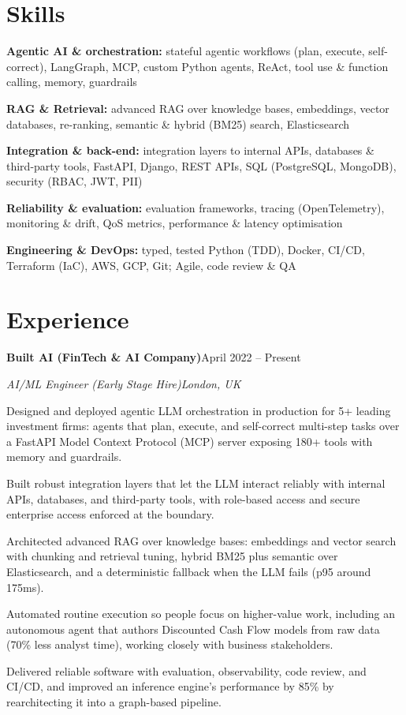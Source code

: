 \documentclass[10pt,a4paper]{article}
\newcommand{\entry}[4]{%
  {\color{company}\bfseries #1}\hfill {\color{muted}#2}\par
  \vspace{1pt}
  {\itshape #3}\hfill {\color{muted}\itshape #4}\par
  \vspace{3pt}%
}
\begin{document}
\section{Skills}
\begin{tight}
  \item[\textcolor{accent}{\small$\bullet$}] \textbf{Agentic AI \& orchestration:} stateful agentic workflows (plan, execute, self-correct), LangGraph, MCP, custom Python agents, ReAct, tool use \& function calling, memory, guardrails
  \item[\textcolor{accent}{\small$\bullet$}] \textbf{RAG \& Retrieval:} advanced RAG over knowledge bases, embeddings, vector databases, re-ranking, semantic \& hybrid (BM25) search, Elasticsearch
  \item[\textcolor{accent}{\small$\bullet$}] \textbf{Integration \& back-end:} integration layers to internal APIs, databases \& third-party tools, FastAPI, Django, REST APIs, SQL (PostgreSQL, MongoDB), security (RBAC, JWT, PII)
  \item[\textcolor{accent}{\small$\bullet$}] \textbf{Reliability \& evaluation:} evaluation frameworks, tracing (OpenTelemetry), monitoring \& drift, QoS metrics, performance \& latency optimisation
  \item[\textcolor{accent}{\small$\bullet$}] \textbf{Engineering \& DevOps:} typed, tested Python (TDD), Docker, CI/CD, Terraform (IaC), AWS, GCP, Git; Agile, code review \& QA
\end{tight}

\section{Experience}
\entry{Built AI (FinTech \& AI Company)}{April 2022 -- Present}{AI/ML Engineer (Early Stage Hire)}{London, UK}
\begin{tight}
  \item Designed and deployed agentic LLM orchestration in production for 5+ leading investment firms: agents that plan, execute, and self-correct multi-step tasks over a FastAPI Model Context Protocol (MCP) server exposing 180+ tools with memory and guardrails.
  \item Built robust integration layers that let the LLM interact reliably with internal APIs, databases, and third-party tools, with role-based access and secure enterprise access enforced at the boundary.
  \item Architected advanced RAG over knowledge bases: embeddings and vector search with chunking and retrieval tuning, hybrid BM25 plus semantic over Elasticsearch, and a deterministic fallback when the LLM fails (p95 around 175ms).
  \item Automated routine execution so people focus on higher-value work, including an autonomous agent that authors Discounted Cash Flow models from raw data (70\% less analyst time), working closely with business stakeholders.
  \item Delivered reliable software with evaluation, observability, code review, and CI/CD, and improved an inference engine's performance by 85\% by rearchitecting it into a graph-based pipeline.
\end{tight}
\end{document}
